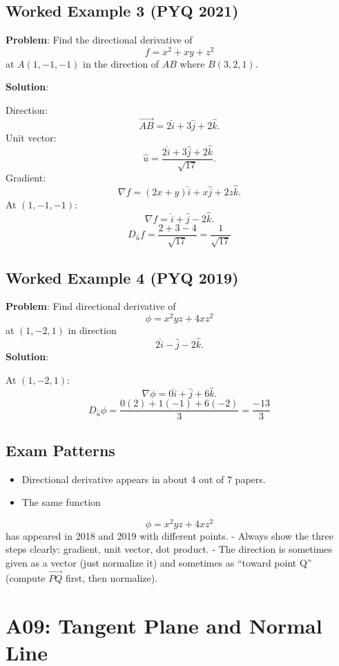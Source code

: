 \documentclass[
]{article}
\providecommand{\tightlist}{%
  \setlength{\itemsep}{0pt}\setlength{\parskip}{0pt}}
\begin{document}
\subsection{Worked Example 3 (PYQ
2021)}\label{worked-example-3-pyq-2021}

\textbf{Problem}: Find the directional derivative of
\[
f = x^2 + xy + z^2
\]
at \(A(1,-1,-1)\) in the direction of \(AB\) where \(B(3, 2, 1)\).

\textbf{Solution}:

Direction:
\[
\vec{AB} = 2\hat{i} + 3\hat{j} + 2\hat{k}.
\]
Unit vector:
\[
\hat{u} = \frac{2\hat{i}+3\hat{j}+2\hat{k}}{\sqrt{17}}.
\]
Gradient:
\[
\nabla f = (2x+y)\hat{i} + x\hat{j} + 2z\hat{k}.
\]
At \((1,-1,-1)\):
\[
\nabla f = \hat{i} + \hat{j} - 2\hat{k}.
\]
\[
D_{\hat{u}}f = \frac{2 + 3 - 4}{\sqrt{17}} = \frac{1}{\sqrt{17}}
\]

\subsection{Worked Example 4 (PYQ
2019)}\label{worked-example-4-pyq-2019}

\textbf{Problem}: Find directional derivative of
\[
\phi = x^2yz + 4xz^2
\]
at \((1, -2, 1)\) in direction
\[
2\hat{i} - \hat{j} - 2\hat{k}.
\]
\textbf{Solution}:

At \((1,-2,1)\):
\[
\nabla\phi = 0\hat{i} + \hat{j} + 6\hat{k}.
\]
\[
D_{\hat{u}}\phi = \frac{0(2) + 1(-1) + 6(-2)}{3} = \frac{-13}{3}
\]

\subsection{Exam Patterns}\label{exam-patterns-7}

\begin{itemize}
\tightlist
\item
  Directional derivative appears in about 4 out of 7 papers.
\item
  The same function
\end{itemize}
\[
\phi = x^2yz + 4xz^2
\]
has appeared in 2018 and 2019 with different points. - Always show the
three steps clearly: gradient, unit vector, dot product. - The direction
is sometimes given as a vector (just normalize it) and sometimes as
``toward point Q'' (compute \(\vec{PQ}\) first, then normalize).

\section{A09: Tangent Plane and Normal
Line}\label{a09-tangent-plane-and-normal-line}
\end{document}
